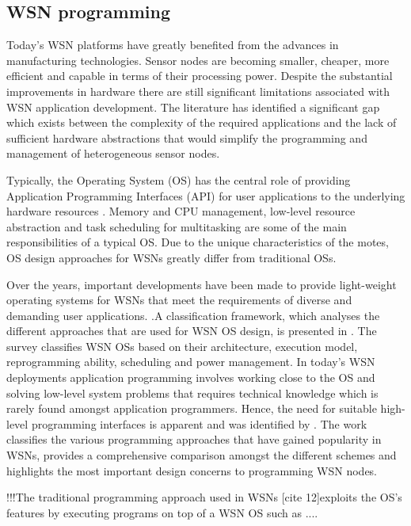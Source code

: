 \subsection{WSN programming}
Today's WSN platforms have greatly benefited from the advances in manufacturing technologies.  Sensor nodes are becoming smaller, cheaper, more efficient and capable in terms of their processing power. Despite the substantial improvements in hardware there are still significant limitations associated with WSN application development. The literature has identified a significant gap \cite{Fok:2009:AMA:1552297.1552299,Levis:2002:MTV:635506.605407,Costa:2007:VMA:1304610.1306527,1621014} which exists between the complexity of the required applications and the lack of sufficient hardware abstractions that would simplify the programming and management of heterogeneous sensor nodes. 

Typically, the Operating System (OS) has the central role of providing Application Programming Interfaces (API) for user applications to the underlying hardware resources \cite{hailperin2007operating,Stallings:1998:OSI:272982}. Memory and CPU management, low-level resource abstraction and task scheduling for multitasking are some of the main responsibilities of a typical OS. 
Due to the unique characteristics of the motes, OS design approaches for WSNs greatly differ from traditional OSs. 

Over the years, important developments have been made to provide light-weight operating systems for WSNs that meet the requirements of diverse and demanding user applications. \cite{1367266,1630599,bhatti2005mantis,eswaran2005nano,s110605900}.A classification framework, which analyses the different approaches that are used for WSN OS design, is presented in \cite{Reddy:2009:WSN:1593545.1593549}. The survey classifies WSN OSs based on their architecture, execution model, reprogramming ability, scheduling and power management. In today's WSN deployments application programming involves working close to the OS and solving low-level system problems that requires technical knowledge which is rarely found amongst application programmers. Hence, the need for suitable high-level programming interfaces is apparent and was identified by \cite{mottola2011programming}. The work classifies the various programming approaches that have gained popularity in WSNs, provides a comprehensive comparison amongst the different schemes and highlights the most important design concerns to programming WSN nodes. 

!!!The traditional programming approach used in WSNs [cite 12]exploits the OS's features by executing programs on top of a WSN OS such as ....

